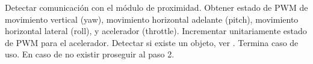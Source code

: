 \begin{UCtrayectoria}
	\UCpaso [\UCactor] Detectar comunicación con el módulo de proximidad. 
	\UCpaso Obtener estado de PWM de movimiento vertical (yaw), movimiento 
	horizontal adelante (pitch), movimiento horizontal lateral (roll), 
	y acelerador (throttle).
	\UCpaso Incrementar unitariamente estado de PWM para el acelerador.
	\UCpaso Detectar si existe un objeto, ver . Termina 
	caso de uso. En caso de no existir proseguir al paso 2.
\end{UCtrayectoria}










